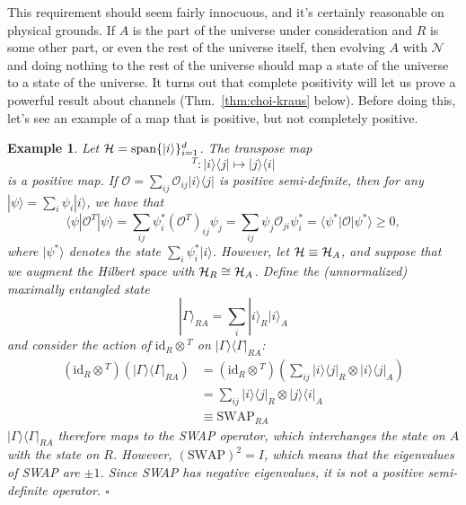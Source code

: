 \documentclass[a4paper,11pt]{article}
\newtheorem{example}[thm]{Example}
\newenvironment{eg}{\begin{example}  \rm  }{    \end{example} }
\newcommand{\eop}{{\hspace*{\fill}$\square$}}
\DeclareMathOperator{\Span}{span}
\newcommand{\bra}[1]{\langle #1|}
\newcommand{\ket}[1]{|#1\rangle}
\newcommand{\ketbra}[2]{| #1 \rangle \langle #2 |}
\newcommand{\Hil}{{\cal H}}
\newcommand{\Oh}{{\mathcal{O}}}
\newcommand{\mrm}[1]{\mathrm{#1}}
\begin{document}
This requirement should seem fairly innocuous, and it's certainly reasonable on physical grounds.
If $A$ is the part of the universe under consideration and $R$ is some other part, or even the rest of the universe itself, then evolving $A$ with $\mathcal{N}$ and doing nothing to the rest of the universe should map a state of the universe to a state of the universe.
It turns out that complete positivity will let us prove a powerful result about channels (Thm.~\ref{thm:choi-kraus} below).
Before doing this, let's see an example of a map that is positive, but not completely positive.

\begin{eg}
Let $\Hil = \Span \{\ket{i} \}_{i=1}^d$.
The transpose map
\begin{equation}
{}^T : \ketbra{i}{j} \mapsto \ketbra{j}{i}
\end{equation}
is a positive map.
If $\Oh = \sum_{ij} \Oh_{ij} \ketbra{i}{j}$ is positive semi-definite, then for any $\ket{\psi} = \sum_i \psi_i \ket{i}$, we have that
\begin{equation}
\bra{\psi} \Oh^T \ket{\psi} = \sum_{ij} \psi_i^* (\Oh^T)_{ij} \psi_j = \sum_{ij} \psi_j \Oh_{ji} \psi_i^* = \bra{\psi^*} \Oh \ket{\psi^*} \geq 0,
\end{equation}
where $\ket{\psi^*}$ denotes the state $\sum_i \psi_i^* \ket{i}$.
However, let $\Hil \equiv \Hil_A$, and suppose that we augment the Hilbert space with $\Hil_R \cong \Hil_A$.
Define the (unnormalized) maximally entangled state
\begin{equation} \label{eq:maxent}
\ket{\Gamma}_{RA} = \sum_i \ket{i}_R \ket{i}_A
\end{equation}
and consider the action of $\mrm{id}_R \otimes {}^{T} $ on $\ketbra{\Gamma}{\Gamma}_{RA}$:
\begin{align*}
(\mrm{id}_R \otimes {}^{T})(\ketbra{\Gamma}{\Gamma}_{RA}) &= (\mrm{id}_R \otimes {}^{T})\left( \sum_{ij} \ketbra{i}{j}_R \otimes \ketbra{i}{j}_A \right) \\
&= \sum_{ij} \ketbra{i}{j}_R \otimes \ketbra{j}{i}_A \\
&\equiv \mrm{SWAP}_{RA}
\end{align*}
$\ketbra{\Gamma}{\Gamma}_{RA}$ therefore maps to the SWAP operator, which interchanges the state on $A$ with the state on $R$.
However, $(\mrm{SWAP})^2 = I$, which means that the eigenvalues of SWAP are $\pm 1$.
Since SWAP has negative eigenvalues, it is not a positive semi-definite operator.
\eop
\end{eg}
\end{document}
